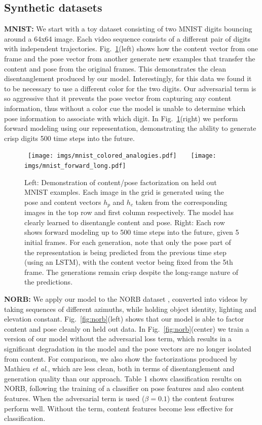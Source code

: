 \documentclass{article}
\newcommand{\fig}[1]{Fig.~\ref{fig:#1}}
\newcommand{\rulesep}{\unskip\ \vrule\ }
\newcommand{\etal}{\textit{et al}.\:}
\begin{document}
\subsection{Synthetic datasets}\label{sec:toy}{\bf MNIST:} We start with a toy dataset consisting of two MNIST
digits bouncing around a 64x64 image. Each video sequence consists of
a different pair of digits with independent
trajectories. \fig{mnist}(left) shows how the content vector from one
frame and the pose vector from another generate new examples that
transfer the content and pose from the original frames. This
demonstrates the clean disentanglement produced by our
model. Interestingly, for this data we found it to be necessary to
use a different color for the two digits. Our adversarial term is so
aggressive that it prevents the pose vector from capturing any content
information, thus without a color cue the model is unable to determine
which pose information to associate with which digit. 
In \fig{mnist}(right) we perform forward modeling using our
representation, demonstrating the ability to generate crisp digits 500
time steps into the future.    

\begin{figure}[b!]
\mbox{
\texttt{[image: imgs/mnist\_colored\_analogies.pdf]}
\rulesep
\texttt{[image: imgs/mnist\_forward\_long.pdf]}
}
\caption{Left: Demonstration of content/pose factorization on held out MNIST
  examples. Each image in the grid is
   generated using the pose and content vectors $h_p$ and $h_c$ taken
   from the corresponding images in the top row and first column
   respectively. The model has clearly
  learned to disentangle content and pose. Right: Each row shows
  forward modeling up to 500 time steps into the future, given 5
  initial frames. For each generation, note that only the pose
  part of the representation is being predicted from the previous time
  step (using an LSTM), with
  the content vector being fixed from the 5th frame. The
  generations remain crisp despite the long-range nature of
  the predictions. 
} \label{fig:mnist}
\end{figure}{\bf NORB:} We apply our model to the NORB dataset \cite{norb}, converted into videos by taking sequences of different azimuths, while holding
object identity, lighting and elevation constant. \fig{norb}(left) shows
that our model is able to factor content and pose cleanly on held out
data. In \fig{norb}(center) we train a version of our model without
the adversarial loss term, which results in a significant
degradation in the model and the pose vectors are no longer isolated
from content. For comparison, we also show the factorizations produced
by Mathieu \etal\cite{mathieu2016}, which are less clean, both in
terms of disentanglement and generation quality than our
approach. Table 1 shows classification results on NORB, following the
training of a classifier on pose features and also content
features. When the adversarial term is used ($\beta=0.1$) the content
features perform well. Without the term, content features become less
effective for classification.    
\end{document}
